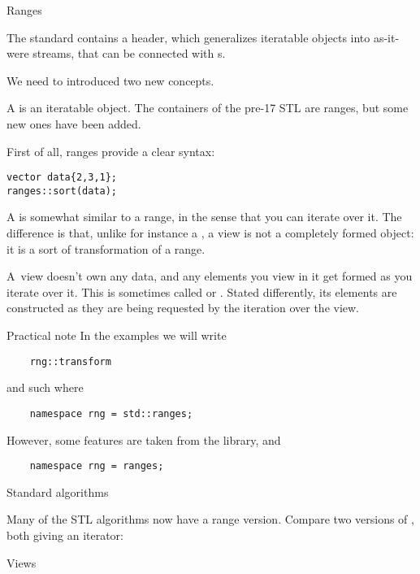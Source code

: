  {Ranges}
\label{sec:ranges}

The  standard contains a  header,
which generalizes iteratable objects into as-it-were streams,
that can be connected with s.

We need to introduced two new concepts.

A  is an iteratable object.
The containers of the pre-17 \ac{STL} are ranges, but
some new ones have been added.

First of all, ranges provide a clear syntax:
\begin{lstlisting}
vector data{2,3,1};
ranges::sort(data);
\end{lstlisting}

A  is somewhat similar to a range, in the sense that
you can iterate over it.
The difference is that, unlike for instance a ,
a view is not a completely formed object:
it is a sort of transformation of a range.

A~view doesn't own any data, and any elements you view in it get formed
as you iterate over it.
This is sometimes called 
or .
Stated differently, its elements are constructed
as they are being requested by the iteration over the view.

\begin{block}{Practical note}
  In the examples we will write
  \begin{lstlisting}
    rng::transform
  \end{lstlisting}
  and such where 
  \begin{lstlisting}
    namespace rng = std::ranges;
  \end{lstlisting}
  However, some features are taken from the  library,
  and
  \begin{lstlisting}
    namespace rng = ranges;
  \end{lstlisting}
\end{block}

 {Standard algorithms}

Many of the \ac{STL} algorithms now have a range version.
Compare two versions of ,
both giving an iterator:
\begin{multicols}{2}
  \columnbreak
\end{multicols}

 {Views}

